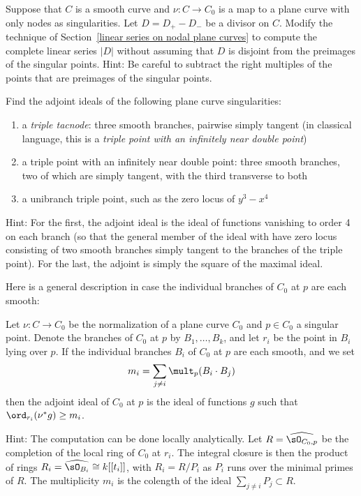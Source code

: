 \begin{exercise}\label{general case of divisors on nodal curves}
Suppose that $C$ is a smooth curve and $\nu: C \to C_0$ is a map to a plane curve with
only nodes as singularities. Let $D = D_{+}-D_{-}$ be a divisor on $C$. Modify the 
technique of Section~\ref{linear series on nodal plane curves} to compute the complete
linear series $|D|$ without assuming that $D$ is disjoint from the preimages of the singular
points. 
Hint: Be careful to subtract the right multiples of the points that are preimages of the singular
points.
\end{exercise}


\begin{exercise}
Find the adjoint ideals of the following plane curve singularities:
\begin{enumerate}
\item a \emph{triple tacnode}: three smooth branches, pairwise simply tangent (in classical language, this is a \emph{triple point with an infinitely near double point})
\item a triple point with an infinitely near double point: three smooth branches, two of which are simply tangent, with the third transverse to both
\item a unibranch triple point, such as the zero locus of $y^3-x^4$
\end{enumerate}

Hint: For the first, the adjoint ideal is the ideal of functions vanishing to order 4 on each branch (so that the general member of the ideal with have zero locus consisting of two smooth branches simply tangent to the branches of the triple point). For the last, the adjoint is simply the square of the maximal ideal.
\end{exercise}

Here is a  general description in case the individual branches of $C_0$ at $p$ are each smooth:

\begin{exercise}
Let $\nu : C \to C_0$ be the normalization of a plane curve $C_0$ and $p \in C_0$ a singular point. Denote the branches of $C_0$ at $p$ by $B_1,\dots,B_k$, and let $r_i$ be the point in $B_i$ lying over $p$. If the individual branches $B_i$ of $C_0$ at $p$ are each smooth, and we set
$$
m_i = \sum_{j \neq i} \mult_p(B_i \cdot B_j)
$$
then the adjoint ideal of $C_0$ at $p$ is the ideal of functions $g$ such that $\ord_{r_i}(\nu^*g) \geq m_i$.

Hint: The computation can be done locally analytically. Let $R = \widehat{\sO_{C_0, p}}$ be the completion of the local ring
of $C_0$ at $r_i$. The integral closure is then the product of rings $R_i = \widehat{\sO_{B_i}} \cong k[[t_i]]$,
with $R_i = R/P_i$ as $P_i$ runs over the minimal primes of $R$. The multiplicity
$m_i$ is the colength of the ideal $\sum_{j\neq i}P_j \subset R$.
\end{exercise}


